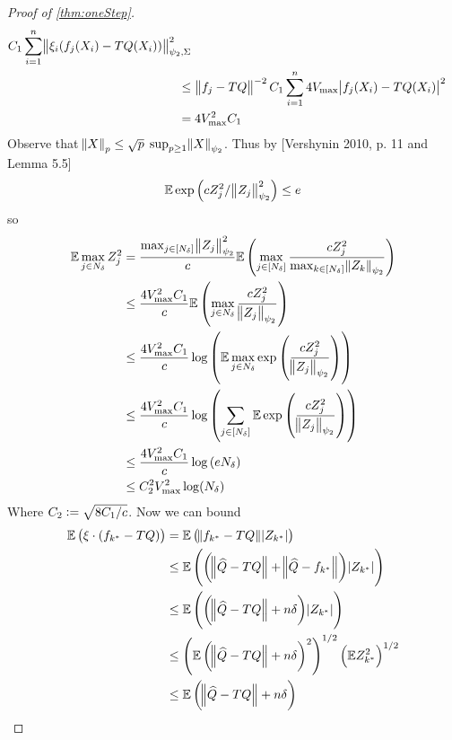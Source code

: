 \begin{proof}[Proof of \cref{thm:oneStep}]
\begin{align}
    C_1 \sum_{i=1}^n \norm{\xi_i(f_j(X_i) - TQ(X_i))}_{\psi_2, \Sigma}^2
    \\ \leq &\; \norm{f_j - TQ}^{-2}
    C_1 \sum_{i=1}^n 4 V_{\max} \abs{f_j(X_i) - TQ(X_i)}^2
    \\ = &\; 4 V_{\max}^2 C_1
  \end{align}
  Observe that $\norm{X}_p \leq \sqrt{p} \; \sup_{p\geq 1} \norm{X}_{\psi_2}$.
  Thus by [Vershynin 2010, p. 11 and Lemma 5.5]
  \begin{equation}
    \mathbb{E} \exp \left(c Z_j^2/\norm{Z_j}_{\psi_2}^2 \right) \leq e
  \end{equation}
  so
  \begin{align}
    \mathbb{E} \max_{j \in N_\delta} Z_j^2
    = &\; \frac{\max_{j \in [N_\delta]} \norm{Z_j}_{\psi_2}^2}{c}
    \mathbb{E} \left( \max_{j \in [N_\delta]} \frac{  c Z_j^2 } 
    {\max_{k \in [N_\delta]} \norm{Z_k}_{\psi_2}} \right)
    \\ \leq &\; \frac{4 V_{\max}^2 C_1}{c}
    \mathbb{E} \left( \max_{j \in N_\delta} \frac{  c Z_j^2 } 
    {\norm{Z_j}_{\psi_2}} \right)
    \\ \leq &\; \frac{4 V_{\max}^2 C_1}{c}
    \log \left( \mathbb{E} \max_{j \in N_\delta} \exp \left( \frac{  c Z_j^2 } 
    {\norm{Z_j}_{\psi_2}} \right) \right)
    \\ \leq &\; \frac{4 V_{\max}^2 C_1}{c}
    \log \left( \sum_{j \in [N_\delta]} \mathbb{E} \exp \left( \frac{  c Z_j^2 } 
    {\norm{Z_j}_{\psi_2}} \right) \right)
    \\ \leq &\; \frac{4 V_{\max}^2 C_1}{c}
    \log \left( e N_\delta \right)
    \\ \leq &\; C_2^2 V_{\max}^2 \log(N_\delta)
  \end{align}
  Where $C_2 \vcentcolon= \sqrt{8 C_1/c}$.
  Now we can bound
  \begin{align}
    \E \left( \xi \cdot (f_{k^*} - TQ) \right)
    &= \E \left( \norm{f_{k^*} - TQ} \abs{Z_{k^*}} \right)
    \label{eq:long1_1}
    \\ &\leq 
    \E \left( \left(\norm{\wh{Q} - TQ} + \norm{\wh{Q} - f_{k^*}} \right)
    \abs{Z_{k^*}} \right) 
    \label{eq:long1_2}
    \\ &\leq 
    \E \left( \left(\norm{\wh{Q} - TQ} + n \delta \right)
    \abs{Z_{k^*}} \right) 
    \label{eq:long1_3}
    \\ &\leq 
    \left( \E \left(\norm{\wh{Q} - TQ} + n \delta \right)^2 \right)^{1/2}
    \left( \E Z_{k^*}^2 \right)^{1/2} 
    \label{eq:long1_4}
    \\ &\leq 
    \E \left(\norm{\wh{Q} - TQ} + n \delta \right) 

\end{align}
\end{proof}
